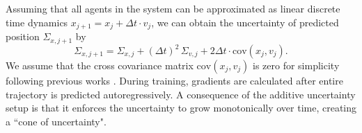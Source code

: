 Assuming that all agents in the system can be approximated as linear discrete time dynamics ${x}_{j+1} = {x}_j + \Delta t \cdot  {v}_j $, we can obtain the uncertainty of predicted position $\Sigma_{x, j+1}$ by %
\[ 
\Sigma_{x, j+1}
            = \Sigma_{x, j} + (\Delta t)^2 \, \Sigma_{v, j} + 2 \Delta t \cdot \text{cov}(x_j, v_j).
\]
%
We assume that the cross covariance matrix $\mathrm{cov}(x_j, v_j) $ is zero for simplicity 
following previous works \cite{trajectron++}. During training, gradients are calculated after entire trajectory is predicted autoregressively. A consequence of the additive uncertainty setup is that it enforces the uncertainty 
to grow monotonically over time, creating a ``cone of uncertainty".

